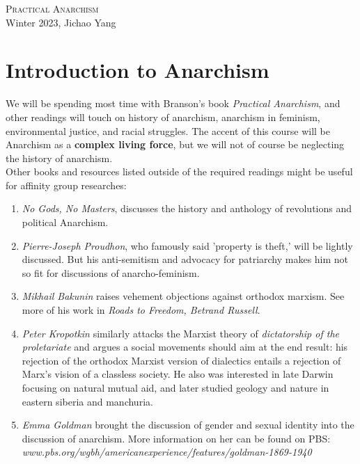 \documentclass[12pt]{article}
\begin{document}
\begin{flushright}
    \textsc{\LARGE Practical Anarchism}\\
    Winter 2023, Jichao Yang
\end{flushright}

\section{Introduction to Anarchism}

We will be spending most time with Branson's book \textit{Practical Anarchism},
and other readings will touch on history of anarchism, anarchism in feminism, environmental justice, and racial struggles. The accent of this course will be Anarchism as a \textbf{complex living force}, but we will not of course be neglecting the history of anarchism.\\

Other books and resources listed outside of the required readings might be useful for affinity group researches:
\begin{enumerate}
    \item \textit{No Gods, No Masters}, discusses the history and anthology of revolutions and political Anarchism.
    \item \textit{Pierre-Joseph Proudhon}, who famously said 'property is theft,' will be lightly discussed. But his anti-semitism and advocacy for patriarchy makes him not so fit for discussions of anarcho-feminism.
    \item \textit{Mikhail Bakunin} raises vehement objections against orthodox marxism. See more of his work in \textit{Roads to Freedom, Betrand Russell}.
    \item \textit{Peter Kropotkin} similarly attacks the Marxist theory of \textit{dictatorship of the proletariate} and argues a social movements should aim at the end result: his rejection of the orthodox Marxist version of dialectics entails a rejection of Marx's vision of a classless society. He also was interested in late Darwin focusing on natural mutual aid, and later studied geology and nature in eastern siberia and manchuria.
    \item \textit{Emma Goldman} brought the discussion of gender and sexual identity into the discussion of anarchism. More information on her can be found on PBS:\\
    \textit{www.pbs.org/wgbh/americanexperience/features/goldman-1869-1940}
\end{enumerate}
\end{document}
